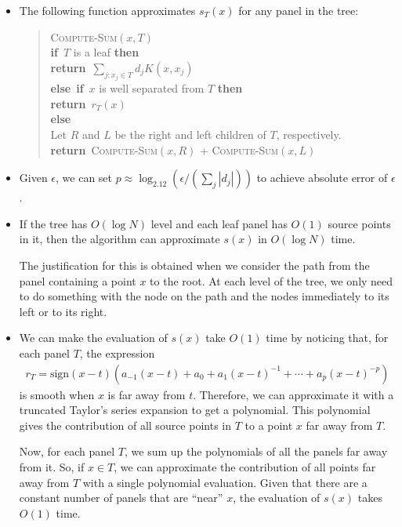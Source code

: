 \documentclass[10pt]{article}
\newcommand{\sign}{\mathrm{sign}}
\newcommand{\IF}{\textbf{if}\ }
\newcommand{\THEN}{\textbf{then}\ }
\newcommand{\ELSE}{\textbf{else}\ }
\newcommand{\RETURN}{\textbf{return}\ }
\begin{document}
\begin{itemize}
  \item The following function approximates $s_T(x)$ for any panel in the tree:
  \begin{verse}
    \textsc{Compute-Sum}$(x, T)$\\
    \quad \IF $T$ is a leaf \THEN\\
    \quad \quad \RETURN $\sum_{j: x_j\in T} d_j K(x, x_j)$\\
    \quad \ELSE \IF $x$ is well separated from $T$ \THEN\\
    \quad \quad \RETURN $r_T(x)$\\
    \quad \ELSE\\
    \quad \quad Let $R$ and $L$ be the right and left children of $T$, respectively.\\
    \quad \quad \RETURN \textsc{Compute-Sum}$(x,R)$ + \textsc{Compute-Sum}$(x,L)$
  \end{verse}
  
  \item Given $\epsilon$, we can set $p \approx \log_{2.12}(\epsilon/(\sum_{j} |d_j|))$ to achieve absolute error of $\epsilon$.
  
  \item If the tree has $O(\log N)$ level and each leaf panel has $O(1)$ source points in it, then the algorithm can approximate $s(x)$ in $O(\log N)$ time. 
  
  The justification for this is obtained when we consider the path from the panel containing a point $x$ to the root. At each level of the tree, we only need to do something with the node on the path and the nodes immediately to its left or to its right.
  
  \item We can make the evaluation of $s(x)$ take $O(1)$ time by noticing that, for each panel $T$, the expression
  \begin{align*}
    r_T = \sign(x-t)(a_{-1}(x-t) + a_0 + a_1(x-t)^{-1} + \dotsb + a_p(x-t)^{-p})
  \end{align*}
  is smooth when $x$ is far away from $t$. Therefore, we can approximate it with a truncated Taylor's series expansion to get a polynomial. This polynomial gives the contribution of all source points in $T$ to a point $x$ far away from $T$.
  
  Now, for each panel $T$, we sum up the polynomials of all the panels far away from it. So, if $x \in T$, we can approximate the contribution of all points far away from $T$ with a single polynomial evaluation. Given that there are a constant number of panels that are ``near'' $x$, the evaluation of $s(x)$ takes $O(1)$ time.
\end{itemize}
\end{document}
